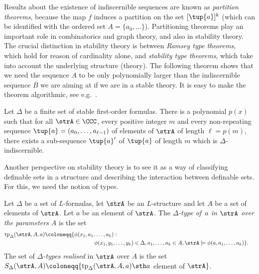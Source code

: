 Results about the existence of indiscernible sequences are known as 
\emph{partition theorems}, because the map $f$ induces a partition
on the set $[\tup{a}]^k$ (which can be identified with the ordered 
set $A=\{a_0,\ldots\}$). Partitioning theorems play an important role in 
combinatorics and graph theory, and also in stability theory. The 
crucial distinction in stability theory is between \emph{Ramsey type 
theorems}, which hold
for reason of cardinality alone, and \emph{stability type theorems},
which take into account the underlying structure (theory). The following
theorem shows that we need the sequence $A$ to be only polynomially larger
than the indiscernible sequence $B$ we are aiming at if we are in a stable theory. 
It is easy to make the theorem algorithmic, see 
e.g.~\cite{siebertz2016polynomial}. 

\begin{theorem}\label{thm:malshelah}
  Let  $\Delta$ be a finite
  set of stable first-order formulas.  There is a polynomial $p(x)$ such that
  for all $\strA\in \CCC$, every positive integer $m$ and every non-repeating sequence
  $\tup{a}=(a_0,\ldots, a_{\ell-1})$ of elements of $\strA$ of length $\ell=p(m)$, there
  exists a sub-sequence $\tup{a}'$ of
  $\tup{a}$ of length $m$ which is
  $\Delta$-indiscernible.
\end{theorem}

Another perspective on stability theory is to see it as a way of 
classifying definable sets in a structure and describing the interaction 
between definable sets. For this, we need the notion of types. 

\begin{definition}
Let $\Delta$ be a set of $L$-formulas, let $\strA$ be an $L$-structure and let
$A$ be a set of elements of $\strA$. Let $a$ be an element of $\strA$. The 
\emph{$\Delta$-type of~$a$ in $\strA$ over the parameters $A$} is the set
\begin{align*}
  \mathrm{tp}_\Delta(\strA, A, a) & \coloneqq  \{ \phi(x_1,a_1,\ldots, a_k)  : &\\
  &  \hspace{3.1cm}
                                \phi(x_1,y_1,\ldots, y_k)\in \Delta,
                                a_1,\ldots, a_k\in A,
                                \strA\models\phi(a,a_1,\ldots, a_k)\}.
\end{align*}
The set of \emph{$\Delta$-types realised} in $\strA$ over $A$ is the set
$S_\Delta(\strA,A) \coloneqq \{ \mathrm{tp}_\Delta(\strA, A, a) \sth a$ element of $\strA\}$.
\end{definition}

